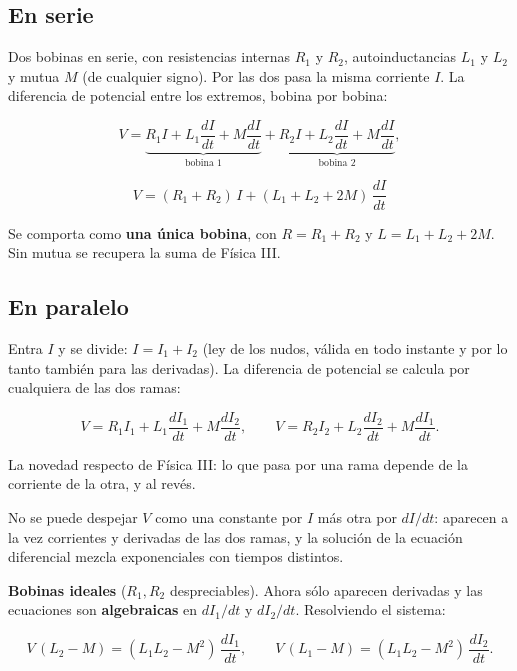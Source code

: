 \documentclass[12pt,a4paper]{article}
\begin{document}
\subsection{En serie}

Dos bobinas en serie, con resistencias internas $R_1$ y $R_2$,
autoinductancias $L_1$ y $L_2$ y mutua $M$ (de cualquier signo). Por las dos
pasa la misma corriente $I$. La diferencia de potencial entre los extremos,
bobina por bobina:

\[
V = \underbrace{R_1 I + L_1\frac{dI}{dt} + M\frac{dI}{dt}}_{\text{bobina 1}}
+ \underbrace{R_2 I + L_2\frac{dI}{dt} + M\frac{dI}{dt}}_{\text{bobina 2}},
\]

\begin{keybox}
\[
\boxed{\ V = (R_1+R_2)\,I + (L_1+L_2+2M)\,\frac{dI}{dt}\ }
\]
\end{keybox}

Se comporta como \textbf{una única bobina}, con $R = R_1+R_2$ y
$L = L_1+L_2+2M$. Sin mutua se recupera la suma de Física III.

\subsection{En paralelo}

Entra $I$ y se divide: $I = I_1 + I_2$ (ley de los nudos, válida en todo
instante y por lo tanto también para las derivadas). La diferencia de potencial
se calcula por cualquiera de las dos ramas:

\[
V = R_1 I_1 + L_1\frac{dI_1}{dt} + M\frac{dI_2}{dt},
\qquad
V = R_2 I_2 + L_2\frac{dI_2}{dt} + M\frac{dI_1}{dt}.
\]

La novedad respecto de Física III: lo que pasa por una rama depende de la
corriente de la otra, y al revés.

\begin{warnbox}
No se puede despejar $V$ como
una constante por $I$ más otra por $dI/dt$: aparecen a la vez corrientes y
derivadas de las dos ramas, y la solución de la ecuación diferencial mezcla
exponenciales con tiempos distintos.
\end{warnbox}

\textbf{Bobinas ideales} ($R_1, R_2$ despreciables). Ahora sólo aparecen derivadas y
las ecuaciones son \textbf{algebraicas} en $dI_1/dt$ y $dI_2/dt$. Resolviendo el
sistema:

\[
V\,(L_2-M) = (L_1L_2-M^2)\,\frac{dI_1}{dt},
\qquad
V\,(L_1-M) = (L_1L_2-M^2)\,\frac{dI_2}{dt}.
\]
\end{document}
